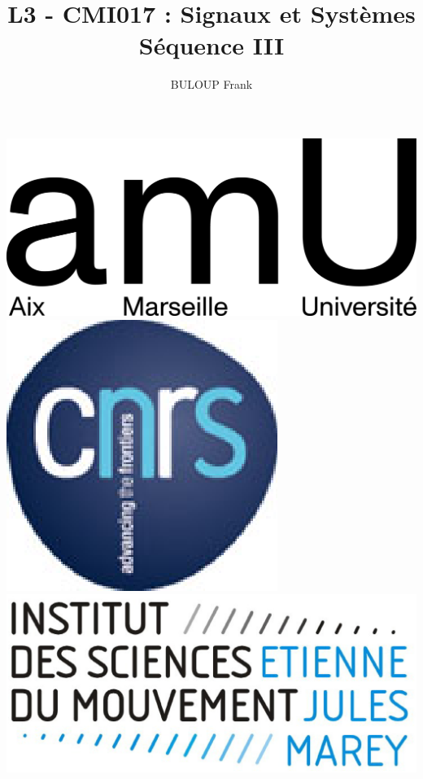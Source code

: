 \documentclass[a4paper,11pt]{beamer}
\title{L3 - CMI017 : Signaux et Systèmes\\Séquence III}
\author{BULOUP Frank}
\institute{Aix Marseille Université\\Institut des Sciences du Mouvement}
\date{}
\begin{document}
\begin{frame}[plain]  
	\titlepage  
	\vspace{1cm}
	
	\includegraphics[scale=0.6]{images/LogoAMU.png}\hspace*{2cm}
	\includegraphics[scale=0.2]{images/LogoCNRS.eps}\hspace*{2cm}
	\includegraphics[scale=0.1]{images/LogoISM.eps}
\end{frame} 
  
\end{document}
